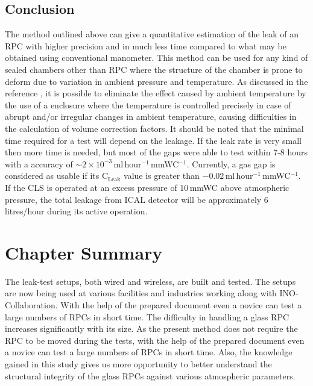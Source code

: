 \subsection{Conclusion}
The method outlined above can give a quantitative estimation of the leak of an RPC with higher precision and in much less time compared to what may be obtained using conventional manometer. This method can be used for any kind of sealed chambers other than RPC where the structure of the chamber is prone to deform due to variation in ambient pressure and temperature. As discussed in the reference \cite{rpcleak2016}, it is possible to eliminate the effect caused by ambient temperature by the use of a enclosure where the temperature is controlled precisely in case of abrupt and/or irregular changes in ambient temperature, causing difficulties in the calculation of volume correction factors. It should be noted that the minimal time required for a test will depend on the leakage. If the leak rate is very small then more time is needed, but most of the gaps were able to test within 7-8 hours with a accuracy of $\sim 2\times 10^{-3}$\,ml\,hour$^{-1}$\,mmWC$^{-1}$. Currently, a gas gap is considered as usable if its $\textrm{C}_{\textrm{Leak}}$ value is greater than $-0.02$\,ml\,hour$^{-1}$\,mmWC$^{-1}$. If the CLS is operated at an excess pressure of 10\,mmWC above atmospheric pressure, the total leakage from ICAL detector will be approximately 6\,litres/hour during its active operation.

\section{Chapter Summary}
The leak-test setups, both wired and wireless, are built and tested. The setups are now being used at various facilities and industries working along with INO-Collaboration. With the help of the prepared document even a novice can test a large numbers of RPCs in short time. The difficulty in handling a glass RPC increases significantly with its size. As the present method does not require the RPC to be moved during the tests, with the help of the prepared document even a novice can test a large numbers of RPCs in short time. Also, the knowledge gained in this study gives us more opportunity to better understand the structural integrity of the glass RPCs against various atmospheric parameters.
